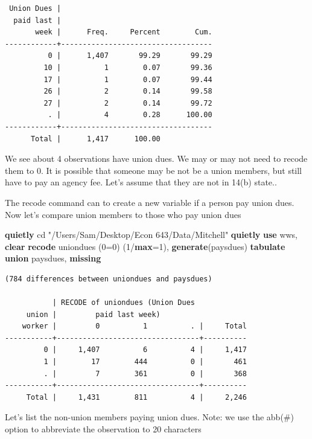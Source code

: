 \documentclass[
]{book}
\newenvironment{Shaded}{\begin{snugshade}}{\end{snugshade}}
\newcommand{\FunctionTok}[1]{\textcolor[rgb]{0.13,0.29,0.53}{\textbf{#1}}}
\newcommand{\KeywordTok}[1]{\textcolor[rgb]{0.13,0.29,0.53}{\textbf{#1}}}
\newcommand{\NormalTok}[1]{#1}
\newcommand{\StringTok}[1]{\textcolor[rgb]{0.31,0.60,0.02}{#1}}
\begin{document}
\begin{verbatim}
 Union Dues |
  paid last |
       week |      Freq.     Percent        Cum.
------------+-----------------------------------
          0 |      1,407       99.29       99.29
         10 |          1        0.07       99.36
         17 |          1        0.07       99.44
         26 |          2        0.14       99.58
         27 |          2        0.14       99.72
          . |          4        0.28      100.00
------------+-----------------------------------
      Total |      1,417      100.00
\end{verbatim}

We see about 4 observations have union dues. We may or may not need to recode them to 0. It is possible that someone may be not be a union members, but still have to pay an agency fee. Let's assume that they are not in 14(b) state..

The recode command can to create a new variable if a person pay union dues. Now let's compare union members to those who pay union dues

\begin{Shaded}
\begin{Highlighting}[]
\KeywordTok{quietly}\NormalTok{ cd }\StringTok{"/Users/Sam/Desktop/Econ 643/Data/Mitchell"}
\KeywordTok{quietly} \KeywordTok{use}\NormalTok{ wws, }\KeywordTok{clear}
\KeywordTok{recode}\NormalTok{ uniondues (0=0) (1/}\FunctionTok{max}\NormalTok{=1), }\KeywordTok{generate}\NormalTok{(paysdues)}
\KeywordTok{tabulate} \KeywordTok{union}\NormalTok{ paysdues, }\FunctionTok{missing}
\end{Highlighting}
\end{Shaded}

\begin{verbatim}
(784 differences between uniondues and paysdues)

           | RECODE of uniondues (Union Dues
     union |         paid last week)
    worker |         0          1          . |     Total
-----------+---------------------------------+----------
         0 |     1,407          6          4 |     1,417 
         1 |        17        444          0 |       461 
         . |         7        361          0 |       368 
-----------+---------------------------------+----------
     Total |     1,431        811          4 |     2,246 
\end{verbatim}

Let's list the non-union members paying union dues.
Note: we use the abb(\#) option to abbreviate the observation to 20 characters
\end{document}
